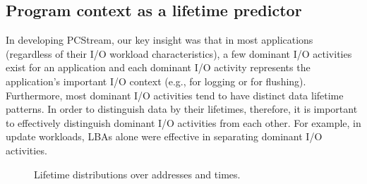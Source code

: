 \vspace{-10pt}
\subsection{Program context as a lifetime predictor}
In developing \textsf{\small PCStream}, our key insight was that in most applications 
(regardless of their I/O workload characteristics), 
a few dominant I/O activities exist for an application
and each dominant I/O activity   
represents the application's important I/O context (e.g., for logging or for flushing). 
Furthermore, most dominant I/O activities tend to have distinct data lifetime patterns.
In order to distinguish data by their lifetimes, therefore, 
it is important to effectively distinguish dominant I/O activities from each other.  
For example, in update workloads, 
LBAs alone were effective in separating dominant I/O activities.  

\begin{figure}[t]
	\centering
	\vspace{-7pt}
	\vspace{-10pt}
	\caption{Lifetime distributions over addresses and times.} %
		\label{fig:lba_lifetime}
	\vspace{-17pt}
\end{figure}

